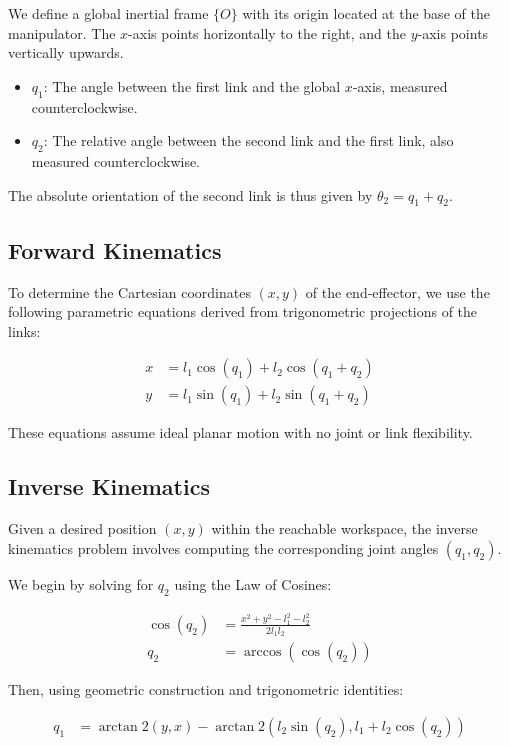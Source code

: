 \documentclass[a4paper,12pt]{article}
\begin{document}
We define a global inertial frame $\{O\}$ with its origin located at the base of the manipulator. The $x$-axis points horizontally to the right, and the $y$-axis points vertically upwards.

\begin{itemize}
    \item $q_1$: The angle between the first link and the global $x$-axis, measured counterclockwise.
    \item $q_2$: The relative angle between the second link and the first link, also measured counterclockwise.
\end{itemize}

The absolute orientation of the second link is thus given by $\theta_2 = q_1 + q_2$.

\subsection*{Forward Kinematics}

To determine the Cartesian coordinates $(x, y)$ of the end-effector, we use the following parametric equations derived from trigonometric projections of the links:

\begin{align}
    x &= l_1 \cos(q_1) + l_2 \cos(q_1 + q_2) \\
    y &= l_1 \sin(q_1) + l_2 \sin(q_1 + q_2)
\end{align}

These equations assume ideal planar motion with no joint or link flexibility.

\subsection*{Inverse Kinematics}

Given a desired position $(x, y)$ within the reachable workspace, the inverse kinematics problem involves computing the corresponding joint angles $(q_1, q_2)$.

We begin by solving for $q_2$ using the Law of Cosines:

\begin{align}
    \cos(q_2) &= \frac{x^2 + y^2 - l_1^2 - l_2^2}{2 l_1 l_2} \\
    q_2 &= \arccos\left(\cos(q_2)\right)
\end{align}

Then, using geometric construction and trigonometric identities:

\begin{align}
    q_1 &= \arctan2(y, x) - \arctan2\left(l_2 \sin(q_2), l_1 + l_2 \cos(q_2)\right)
\end{align}
\end{document}
